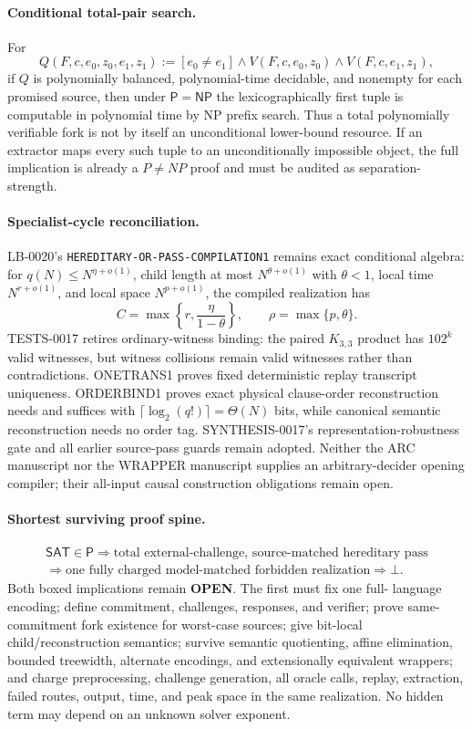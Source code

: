 \documentclass[11pt]{article}
\newcommand{\statusopen}{\textcolor{openstatus}{\textbf{OPEN}}}
\begin{document}
\paragraph{Conditional total-pair search.}
For
\[
 Q(F,c,e_0,z_0,e_1,z_1):=[e_0\ne e_1]\wedge
 V(F,c,e_0,z_0)\wedge V(F,c,e_1,z_1),
\]
if $Q$ is polynomially balanced, polynomial-time decidable, and nonempty for
each promised source, then under $\mathsf P=\mathsf{NP}$ the
lexicographically first tuple is computable in polynomial time by NP prefix
search.  Thus a total polynomially verifiable fork is not by itself an
unconditional lower-bound resource.  If an extractor maps every such tuple to
an unconditionally impossible object, the full implication is already a
$P\ne NP$ proof and must be audited as separation-strength.

\paragraph{Specialist-cycle reconciliation.}
LB-0020's \texttt{HEREDITARY-OR-PASS-COMPILATION1} remains exact conditional
algebra: for $q(N)\le N^{\eta+o(1)}$, child length at most
$N^{\theta+o(1)}$ with $\theta<1$, local time $N^{r+o(1)}$, and local space
$N^{p+o(1)}$, the compiled realization has
\[
 C=\max\left\{r,\frac{\eta}{1-\theta}\right\},
 \qquad \rho=\max\{p,\theta\}.
\]
TESTS-0017 retires ordinary-witness binding: the paired $K_{3,3}$ product has
$102^k$ valid witnesses, but witness collisions remain valid witnesses rather
than contradictions.  ONETRANS1 proves fixed deterministic replay transcript
uniqueness.  ORDERBIND1 proves exact physical clause-order reconstruction
needs and suffices with $\lceil\log_2(q!)\rceil=\Theta(N)$ bits, while
canonical semantic reconstruction needs no order tag.  SYNTHESIS-0017's
representation-robustness gate and all earlier source-pass guards remain
adopted.  Neither the ARC manuscript  nor the WRAPPER
manuscript  supplies an arbitrary-decider opening compiler;
their all-input causal construction obligations remain open.

\paragraph{Shortest surviving proof spine.}
\[
\begin{gathered}
\mathsf{SAT}\in\mathsf P
\Longrightarrow
\boxed{\text{total external-challenge, source-matched hereditary pass}}\\
\Longrightarrow
\boxed{\text{one fully charged model-matched forbidden realization}}
\Longrightarrow\bot .
\end{gathered}
\]
Both boxed implications remain \statusopen.  The first must fix one full-
language encoding; define commitment, challenges, responses, and verifier;
prove same-commitment fork existence for worst-case sources; give bit-local
child/reconstruction semantics; survive semantic quotienting, affine
elimination, bounded treewidth, alternate encodings, and extensionally
equivalent wrappers; and charge preprocessing, challenge generation, all
oracle calls, replay, extraction, failed routes, output, time, and peak space
in the same realization.  No hidden term may depend on an unknown solver
exponent.
\end{document}
